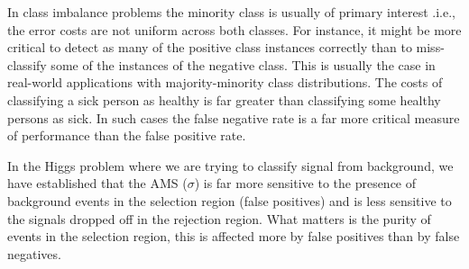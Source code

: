 
In class imbalance problems the minority class is usually of primary interest .i.e., the error costs are not uniform across both classes. For instance, it might be more critical to detect as many of the positive class instances correctly than to miss-classify some of the instances of the negative class. This is usually the case in real-world applications with majority-minority class distributions. The costs of classifying a sick person as healthy is far greater than classifying some healthy persons as sick. In such cases the false negative rate is a far more critical measure of performance than the false positive rate.

In the Higgs problem where we are trying to classify signal from background, we have established that the AMS ($\sigma$) is far more sensitive to the presence of background events in the selection region (false positives) and is less sensitive to the signals dropped off in the rejection region. What matters is the purity of events in the selection region, this is affected more by false positives than by false negatives. 

